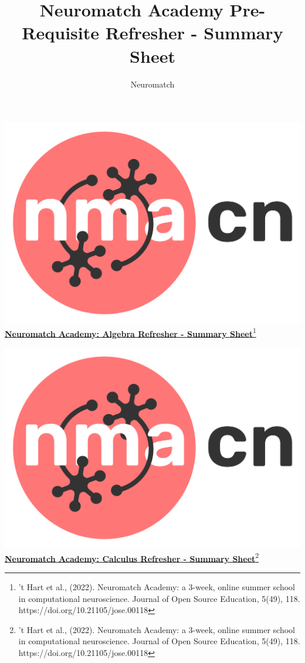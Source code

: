 \documentclass[10pt,a4paper]{article}
\title{Neuromatch Academy Pre-Requisite Refresher - Summary Sheet}
\author{Neuromatch}
\begin{document}
\includegraphics[scale=0.03]{Figures/NMACN.png}\href{https://compneuro.neuromatch.io/tutorials/intro.html}{\textbf{\Huge{Neuromatch Academy: Algebra Refresher - Summary Sheet}}\footnote{’t Hart et al., (2022). Neuromatch Academy: a 3-week, online summer school in computational neuroscience. Journal of Open Source Education, 5(49), 118. https://doi.org/10.21105/jose.00118}}
\small
\begin{multicols}{3}
\let\clearpage\relax

\end{multicols}
\newpage
\clearpage
\includegraphics[scale=0.03]{Figures/NMACN.png}\href{https://compneuro.neuromatch.io/tutorials/intro.html}{\textbf{\Huge{Neuromatch Academy: Calculus Refresher - Summary Sheet}}\footnote{’t Hart et al., (2022). Neuromatch Academy: a 3-week, online summer school in computational neuroscience. Journal of Open Source Education, 5(49), 118. https://doi.org/10.21105/jose.00118}}
\end{document}
